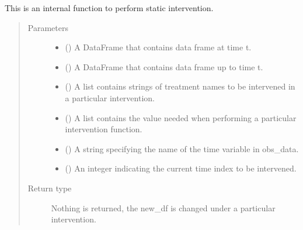 \documentclass[letterpaper,10pt,english]{sphinxmanual}
\begin{document}
\begin{fulllineitems}
\label{\detokenize{Specifications/Intervention:pygformula.parametric_gformula.interventions.static}}
\sphinxAtStartPar
This is an internal function to perform static intervention.
\begin{quote}\begin{description}
\item[{Parameters}] \leavevmode\begin{itemize}
\item {} 
\sphinxAtStartPar
{} () \textendash{} A DataFrame that contains data frame at time t.

\item {} 
\sphinxAtStartPar
{} () \textendash{} A DataFrame that contains data frame up to time t.

\item {} 
\sphinxAtStartPar
{} () \textendash{} A list contains strings of treatment names to be intervened in a particular intervention.

\item {} 
\sphinxAtStartPar
{} () \textendash{} A list contains the value needed when performing a particular intervention function.

\item {} 
\sphinxAtStartPar
{} () \textendash{} A string specifying the name of the time variable in obs\_data.

\item {} 
\sphinxAtStartPar
{} () \textendash{} An integer indicating the current time index to be intervened.

\end{itemize}

\item[{Return type}] \leavevmode
\sphinxAtStartPar
Nothing is returned, the new\_df is changed under a particular intervention.

\end{description}\end{quote}

\end{fulllineitems}
\end{document}
